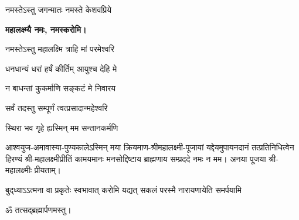 \begin{center}


{नमस्तेऽस्तु जगन्मातः नमस्ते केशवप्रिये}

\textbf{महालक्ष्म्यै नमः, नमस्करोमि।}


{नमस्तेऽस्तु महालक्ष्मि त्राहि मां परमेश्वरि}

{धनधान्यं धरां हर्षं कीर्तिम् आयुश्च देहि मे}

{न बाधन्तां कुकर्माणि सङ्कटं मे निवारय}


{सर्वं तदस्तु सम्पूर्णं त्वत्प्रसादान्महेश्वरि}

{स्थिरा भव गृहे ह्यस्मिन् मम सन्तानकर्मणि}


\hiranyagarbha
आश्वयुज-अमावास्या-पुण्यकालेऽस्मिन् मया क्रियमाण-श्री\-महा\-लक्ष्मी-पूजायां
यद्देयमुपायन\-दानं तत्प्रति\-निधित्वेन हिरण्यं श्री-महा\-लक्ष्मी\-प्रीतिं
कामयमानः मनसोद्दिष्टाय ब्राह्मणाय सम्प्रददे नमः न मम।
अनया पूजया श्री-महालक्ष्मीः प्रीयताम्।


{बुद्‌ध्याऽऽत्मना वा प्रकृतेः स्वभावात्}
{करोमि यद्यत् सकलं परस्मै}
{नारायणायेति समर्पयामि}

ॐ तत्सद्ब्रह्मार्पणमस्तु।

\end{center}